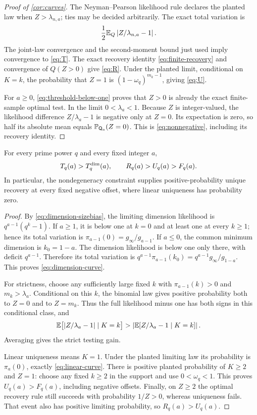 \begin{proof}[Proof of \cref{cor:curves}]
The Neyman--Pearson likelihood rule declares the planted law when
$Z>\lambda_{n,a}$; ties may be decided arbitrarily. The exact total
variation is
\[
 \frac12\mathbb E_Q\left|Z/\lambda_{n,a}-1\right|.
\]
The joint-law convergence and the second-moment bound just used imply
convergence to \eqref{eq:T}. The exact recovery identity
\eqref{eq:finite-recovery} and convergence of $Q(Z>0)$ give
\eqref{eq:R}. Under the planted limit, conditional on $K=k$, the
probability that $Z=1$ is $(1-\omega_q)^{m_k-1}$, giving
\eqref{eq:U}.

For $a\ge0$, \eqref{eq:threshold-below-one} proves that $Z>0$ is
already the exact finite-sample optimal test. In the limit
$0<\lambda_a<1$. Because $Z$ is integer-valued, the likelihood difference
$Z/\lambda_a-1$ is negative only at $Z=0$. Its expectation is zero,
so half its absolute mean equals $\mathbb P_{\mathsf Q_a}(Z=0)$. This is
\eqref{eq:nonnegative}, including its recovery identity.
\end{proof}

\begin{proposition}
\label{prop:strict}
For every prime power $q$ and every fixed integer $a$,
\[
 T_q(a)>T_q^{\rm dim}(a),\qquad R_q(a)>U_q(a)>F_q(a).
\]
In particular, the nondegeneracy constraint supplies positive-probability
unique recovery at every fixed negative offset, where linear uniqueness
has probability zero.
\end{proposition}

\begin{proof}
By \eqref{eq:dimension-sizebias}, the limiting dimension likelihood is
$q^{a-1}(q^k-1)$. If $a\ge1$, it is below one at $k=0$ and at
least one at every $k\ge1$; hence its total variation is
$\pi_{a-1}(0)=g_\infty/g_{a-1}$. If $a\le0$, the common minimum
dimension is $k_0=1-a$. The dimension likelihood is below one only
there, with deficit $q^{a-1}$. Therefore its total variation is
$q^{a-1}\pi_{a-1}(k_0)=q^{a-1}g_\infty/g_{1-a}$. This proves
\eqref{eq:dimension-curve}.

For strictness, choose any sufficiently large fixed $k$ with
$\pi_{a-1}(k)>0$ and $m_k>\lambda_a$. Conditional on this $k$, the
binomial law gives positive probability both to $Z=0$ and to $Z=m_k$.
Thus the full likelihood minus one has both signs in this conditional
class, and
\[
 \mathbb E\bigl[|Z/\lambda_a-1|\mid K=k\bigr]
 >\left|\mathbb E[Z/\lambda_a-1\mid K=k]\right|.
\]
Averaging gives the strict testing gain.

Linear uniqueness means $K=1$. Under the planted limiting law its
probability is $\pi_a(0)$, exactly \eqref{eq:linear-curve}. There
is positive planted probability of $K\ge2$ and $Z=1$: choose any
fixed $k\ge2$ in the support and use $0<\omega_q<1$. This proves
$U_q(a)>F_q(a)$, including negative offsets. Finally, on $Z\ge2$
the optimal recovery rule still succeeds with probability $1/Z>0$,
whereas uniqueness fails. That event also has positive limiting
probability, so $R_q(a)>U_q(a)$.
\end{proof}


